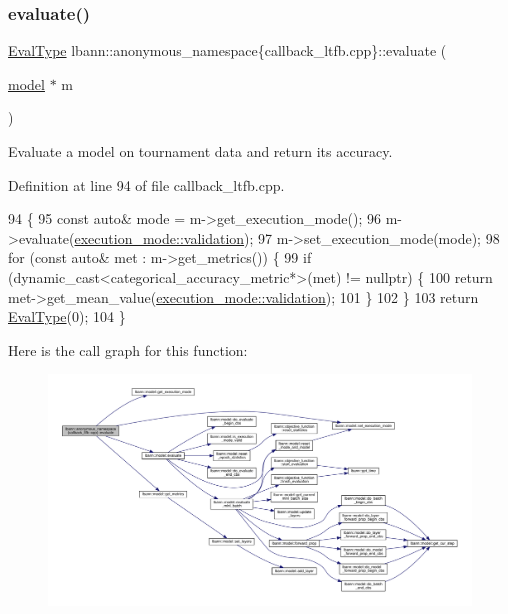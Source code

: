 \subsubsection{\texorpdfstring{evaluate()}{evaluate()}}
{\footnotesize\ttfamily \hyperlink{base_8hpp_a3266f5ac18504bbadea983c109566867}{Eval\+Type} lbann\+::anonymous\+\_\+namespace\{callback\+\_\+ltfb.\+cpp\}\+::evaluate (\begin{DoxyParamCaption}\item[{\hyperlink{classlbann_1_1model}{model} $\ast$}]{m }\end{DoxyParamCaption})}

Evaluate a model on tournament data and return its accuracy. 

Definition at line 94 of file callback\+\_\+ltfb.\+cpp.


\begin{DoxyCode}
94                             \{
95   \textcolor{keyword}{const} \textcolor{keyword}{auto}& mode = m->get\_execution\_mode();
96   m->evaluate(\hyperlink{base_8hpp_a2781a159088df64ed7d47cc91c4dc0a8aa617908b172c473cb8e8cda059e55bf0}{execution\_mode::validation});
97   m->set\_execution\_mode(mode);
98   \textcolor{keywordflow}{for} (\textcolor{keyword}{const} \textcolor{keyword}{auto}& met : m->get\_metrics()) \{
99     \textcolor{keywordflow}{if} (dynamic\_cast<categorical\_accuracy\_metric*>(met) != \textcolor{keyword}{nullptr}) \{
100       \textcolor{keywordflow}{return} met->get\_mean\_value(\hyperlink{base_8hpp_a2781a159088df64ed7d47cc91c4dc0a8aa617908b172c473cb8e8cda059e55bf0}{execution\_mode::validation});
101     \}
102   \}
103   \textcolor{keywordflow}{return} \hyperlink{base_8hpp_a3266f5ac18504bbadea983c109566867}{EvalType}(0);
104 \}
\end{DoxyCode}
Here is the call graph for this function\+:\nopagebreak
\begin{figure}[H]
\begin{center}
\leavevmode
\includegraphics[width=350pt]{namespacelbann_1_1anonymous__namespace_02callback__ltfb_8cpp_03_a2525bf058156612d7847d0754277e4fc_cgraph}
\end{center}
\end{figure}
